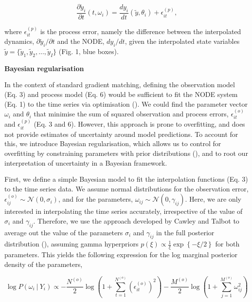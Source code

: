 \documentclass[11pt, oneside]{article}
\begin{document}
\vspace{-0.5cm}
\begin{equation}
    \frac{\partial \tilde{y}_i}{\partial t} (t, \omega_i) = \frac{dy_i}{dt} \left( \tilde{y},\theta_i \right) + \epsilon^{(p)}_{it},
\end{equation}

where $\epsilon^{(p)}_{it}$ is the process error, namely the difference between the interpolated dynamics, $\partial \tilde{y}_i/\partial t$ and the NODE, $dy_i/dt$, given the interpolated state variables $\tilde{y} = \{\tilde{y}_1,\tilde{y}_2, ...,\tilde{y}_I\}$ (Fig. 1, blue boxes). 

\textbf{Bayesian regularisation}

In the context of standard gradient matching, defining the observation model (Eq. 3) and process model (Eq. 6) would be sufficient to fit the NODE system (Eq. 1) to the time series via optimisation (\cite{Jost2000,Ellner2002,Wu2005}).
We could find the parameter vector $\omega_i$ and $\theta_i$ that minimise the sum of squared observation and process errors, $\epsilon_{it}^{(o)}$ and $\epsilon_{it}^{(p)}$ (Eq. 3 and 6).
However, this approach is prone to overfitting, and does not provide estimates of uncertainty around model predictions. 
To account for this, we introduce Bayesian regularisation, which allows us to control for overfitting by constraining parameters with prior distributions (\cite{Cawley2007}), and to root our interpretation of uncertainty in a Bayesian framework.

First, we define a simple Bayesian model to fit the interpolation functions (Eq. 3) to the time series data.
We assume normal distributions for the observation error, $\epsilon^{(o)}_{ij} \sim \mathcal{N}(0,\sigma_i)$, and for the parameters, $\omega_{ij} \sim \mathcal{N}(0,\gamma_{ij})$.
Here, we are only interested in interpolating the time series accurately, irrespective of the value of $\sigma_i$ and $\gamma_{ij}$.
Therefore, we use the approach developed by Cawley and Talbot to average out the value of the parameters $\sigma_i$ and $\gamma_{ij}$ in the full posterior distribution (\cite{Cawley2007}), assuming gamma hyperpriors $p(\xi) \propto \frac{1}{\xi} \exp\left\{- \xi/2\right\}$ for both parameters.
This yields the following expression for the log marginal posterior density of the parameters,

\vspace{-0.5cm}
\begin{equation}
    \log P(\omega_i ~|~ Y_i) \propto - \frac{N^{(o)}}{2} \log \left(1 + \sum_{t=1}^{N^{(o)}} \left( \epsilon^{(o)}_{it} \right)^2 \right) - \frac{M^{(o)}}{2} \log \left(1 + \sum_{j=1}^{M^{(o)}} \omega_{ij}^2 \right)
\end{equation}
\end{document}
